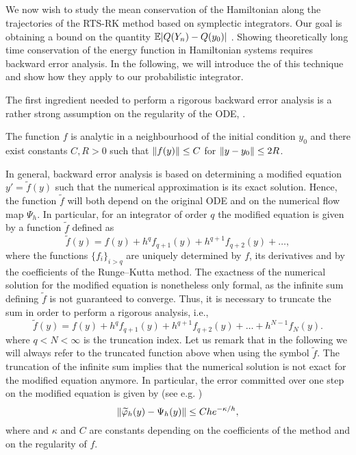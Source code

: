 \documentclass[10pt]{article}
\begin{document}
\subsection{}\label{sec:Hamiltonian_2} We now wish to study the mean conservation of the Hamiltonian along the trajectories of the RTS-RK method based on symplectic integrators. Our goal is obtaining a bound on the quantity $\operatorname{\mathbb{E}}\lvert Q(Y_n) - Q(y_0)\rvert$ . Showing theoretically long time conservation of the energy function in Hamiltonian systems requires backward error analysis. In the following, we will introduce the  of this technique and show how they apply to our probabilistic integrator. 

The first ingredient needed to perform a rigorous backward error analysis is a rather strong assumption on the regularity of the ODE, .
\begin{assumption}\label{as:RegHamiltonian} The function $f$ is analytic in a neighbourhood of the initial condition $y_0$ and there exist constants $C, R > 0$ such that $\lVert f(y)\rVert \leq C$ for $\lVert y - y_0\rVert \leq 2R$.
\end{assumption}
In general, backward error analysis is based on determining a modified equation $y' = \tilde f(y)$ such that the numerical approximation is its exact solution. Hence, the function $\tilde f$ will both depend on the original ODE and on the numerical flow map $\Psi_h$. In particular, for an integrator of order $q$ the modified equation is given by a function $\tilde f$ defined as
\begin{equation}
\tilde f(y) = f(y) + h^q f_{q+1}(y) + h^{q+1} f_{q+2}(y) + \ldots,
\end{equation}
where the functions $\{f_i\}_{i>q}$ are uniquely determined by $f$, its derivatives and by the coefficients of the Runge--Kutta method. The exactness of the numerical solution for the modified equation is nonetheless only formal, as the infinite sum defining $\tilde f$ is not guaranteed to converge. Thus, it is necessary to truncate the sum in order to perform a rigorous analysis, i.e.,
\begin{equation}
\tilde f(y) = f(y) + h^q f_{q+1}(y) + h^{q+1} f_{q+2}(y) + \ldots + h^{N-1}f_N(y).
\end{equation}
where $q < N < \infty$ is the truncation index. Let us remark that in the following we will always refer to the truncated function above when using the symbol $\tilde f$. The truncation of the infinite sum implies that the numerical solution is not exact for the modified equation anymore. In particular, the error committed over one step on the modified equation is given by (see e.g. \cite[Theorem IX.7.6]{HLW06})
\begin{equation}\label{eq:OneStepModEq}
\lVert\widetilde {\varphi}_h(y) - \Psi_h(y)\rVert \leq Che^{-\kappa/h},
\end{equation}
where  and $\kappa$ and $C$ are constants depending on the coefficients of the method and on the regularity of $f$.
\end{document}
